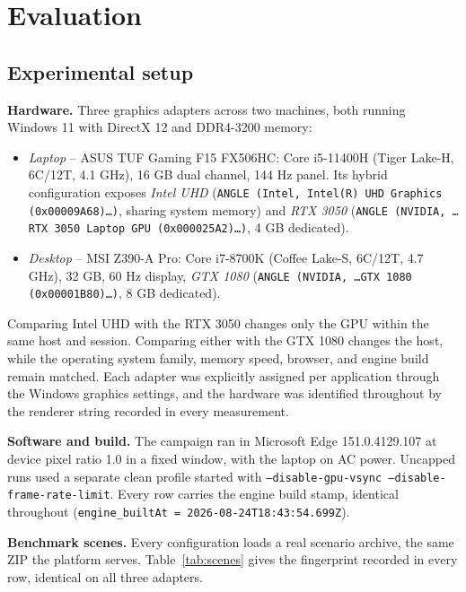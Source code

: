 \section{Evaluation}
\label{sec:evaluation}

\subsection{Experimental setup}
\label{sec:setup}

\textbf{Hardware.} Three graphics adapters across two machines, both running Windows 11 with DirectX 12 and DDR4-3200 memory:

\begin{sloppypar}
\begin{itemize}[leftmargin=1.4em,itemsep=1pt,topsep=2pt]
    \item \textit{Laptop} -- ASUS TUF Gaming F15 FX506HC: Core i5-11400H (Tiger Lake-H, 6C/12T, 4.1 GHz), 16 GB dual channel, 144 Hz panel. Its hybrid configuration exposes \emph{Intel UHD} (\texttt{ANGLE\allowbreak{} (Intel, Intel(R) UHD Graphics (0x00009A68)\dots)}, sharing system memory) and \emph{RTX 3050} (\texttt{ANGLE\allowbreak{} (NVIDIA, \dots RTX 3050 Laptop GPU (0x000025A2)\dots)}, 4 GB dedicated).
    \item \textit{Desktop} -- MSI Z390-A Pro: Core i7-8700K (Coffee Lake-S, 6C/12T, 4.7 GHz), 32 GB, 60 Hz display, \emph{GTX 1080} (\texttt{ANGLE\allowbreak{} (NVIDIA, \dots GTX 1080 (0x00001B80)\dots)}, 8 GB dedicated).
\end{itemize}
\end{sloppypar}

Comparing Intel UHD with the RTX 3050 changes only the GPU within the same host and session. Comparing either with the GTX 1080 changes the host, while the operating system family, memory speed, browser, and engine build remain matched. Each adapter was explicitly assigned per application through the Windows graphics settings, and the hardware was identified throughout by the renderer string recorded in every measurement.

\textbf{Software and build.} The campaign ran in Microsoft Edge 151.0.4129.107 at device pixel ratio 1.0 in a fixed window, with the laptop on AC power. Uncapped runs used a separate clean profile started with \texttt{--disable-gpu-vsync --disable-frame-rate-limit}. Every row carries the engine build stamp, identical throughout (\texttt{engine\_builtAt = 2026-08-24T18:43:54.699Z}). 

\textbf{Benchmark scenes.} Every configuration loads a real scenario archive, the same ZIP the platform serves. Table~\ref{tab:scenes} gives the fingerprint recorded in every row, identical on all three adapters.

